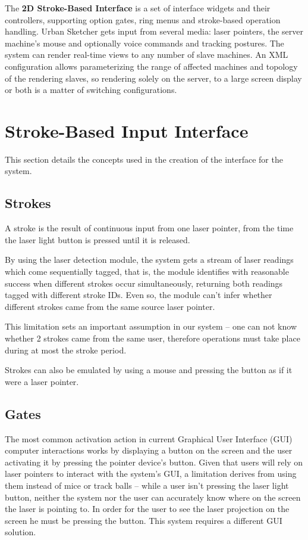 The \textbf{2D Stroke-Based Interface} is 
		a set of interface widgets and their controllers,
		supporting option gates, ring menus and stroke-based operation handling.
Urban Sketcher gets input from several media:
laser pointers, the server machine's mouse and optionally voice commands and tracking postures.
The system can render real-time views to any number of slave machines.
An XML configuration allows parameterizing the range of affected machines and topology of the rendering slaves,
so rendering solely on the server, to a large screen display or both is a matter of switching configurations.


\section{Stroke-Based Input Interface}

This section details the concepts used in the creation of the interface for the system.

\subsection{Strokes}

A stroke is the result of continuous input from one laser pointer, from the time the laser
light button is pressed until it is released. 

By using the laser detection module, the system gets a stream of laser readings which
come sequentially tagged, that is, the module identifies with reasonable success when different strokes
occur simultaneously, returning both readings tagged with different stroke IDs.
Even so, the module can't infer whether different strokes came from the same source laser pointer.

This limitation sets an important assumption in our system -- one can not know whether 2 strokes came
from the same user, therefore operations must take place during at most the stroke period.

Strokes can also be emulated by using a mouse and pressing
the button as if it were a laser pointer.


\subsection{Gates}

The most common activation action in current Graphical User Interface (GUI) computer interactions works
by displaying a button on the screen and the user activating it by pressing the pointer device's button.
Given that users will rely on laser pointers to interact with the system's GUI, a limitation derives from
using them instead of mice or track balls -- while a user isn't pressing the laser light button,
neither the system nor the user can accurately know where on the screen the laser is pointing to.
In order for the user to see the laser projection on the screen he must be pressing the button.
This system requires a different GUI solution.

